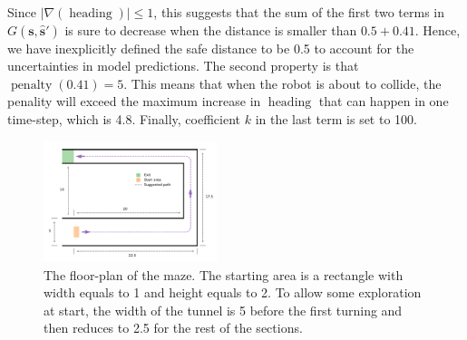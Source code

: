 Since $|\nabla(\operatorname{heading})| \leq 1$, this suggests that the sum of the first two terms in $G(\bm{s}, \hat{\bm{s}}')$ is sure to decrease when the distance is smaller than $0.5 + 0.41$.
Hence, we have inexplicitly defined the safe distance to be 0.5 to account for the uncertainties in model predictions.
The second property is that $\operatorname{penalty}(0.41) = 5$. 
This means that when the robot is about to collide, the penality will exceed the maximum increase in $\operatorname{heading}$ that can happen in one time-step, which is 4.8.
Finally, coefficient $k$ in the last term is set to 100.




 



\begin{figure}[h]
\centering
\includegraphics[width=0.45\textwidth]{tunnel_floorplan.pdf}
\caption{The floor-plan of the maze.
The starting area is a rectangle with width equals to 1 and height equals to 2.
To allow some exploration at start, the width of the tunnel is 5 before the first turning and then reduces to 2.5 for the rest of the sections.
}
\label{maze}
\end{figure}





